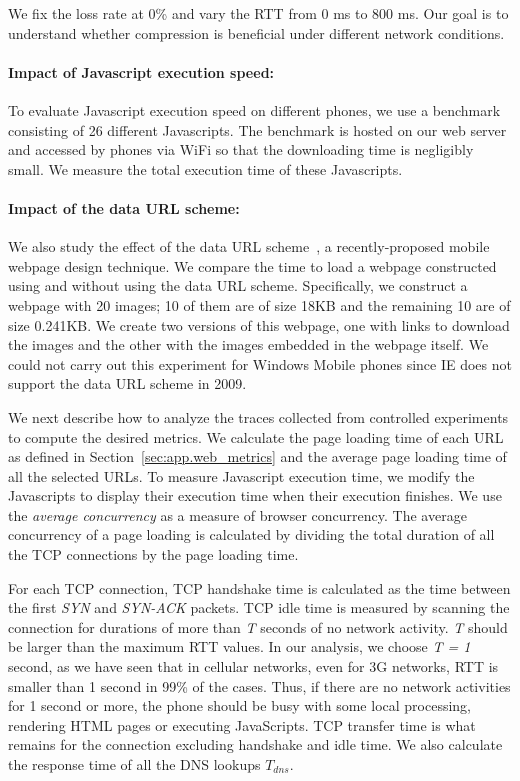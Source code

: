 We fix the loss rate at 0\% and vary the RTT from 0 ms to 800 ms. Our goal is to understand whether compression is beneficial under different network conditions.

\paragraph{Impact of Javascript execution speed:} To evaluate 
Javascript execution speed on different phones, we use a 
benchmark~\cite{sunspider} consisting of 26 different Javascripts. 
The benchmark is hosted on our web server and accessed by phones 
via WiFi so that the downloading time is negligibly small. We 
measure the total execution time of these Javascripts. 

\paragraph{Impact of the data URL scheme:} We also study the effect 
of the data URL scheme~\cite{rfc2397}, a recently-proposed mobile 
webpage design technique. We compare the time to load a webpage 
constructed using and without using the data URL scheme. 
Specifically, we construct a webpage with 20 images; 10 of them are of size 18KB and the remaining 10 are of size 0.241KB. We create two versions of this webpage, one with links to download the images and the other with the images embedded in the webpage itself. We could not carry out this experiment for Windows Mobile phones since IE does not support the data URL scheme in 2009.



We next describe how to analyze the traces collected from controlled
experiments to compute the desired metrics. We calculate the page 
loading time of each URL as defined in Section~\ref{sec:app.web_metrics} 
and the average page loading time of all the selected URLs. To measure 
Javascript execution time, we modify the Javascripts to display their 
execution time when their execution finishes. We use the
{\em average concurrency} as a measure of browser concurrency. The
average concurrency of a page loading is calculated by dividing the 
total duration of all the TCP connections by the page loading time. 

For each TCP connection, TCP handshake time is calculated as the time
between the first \emph{SYN} and \emph{SYN-ACK} packets. TCP idle time 
is measured by scanning the connection for durations of more than 
\emph{T} seconds of no network activity. \emph{T} should be larger 
than the maximum RTT values. In our analysis, we choose \emph{T = 1} second, as we have seen that in cellular networks, even for 3G networks, RTT is smaller than 1 second in 99\% of the cases. Thus, if there
are no network activities for 1 second or more, the phone should 
be busy with some local processing, \eg rendering HTML pages or executing JavaScripts.
TCP transfer time is what remains for the connection excluding handshake and idle time. 
We also calculate the response time of all the DNS lookups $T_{dns}$. 


